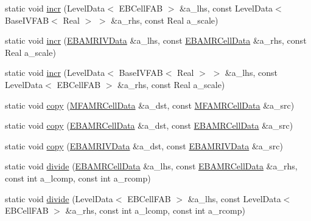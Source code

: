 \begin{DoxyCompactItemize}
\item 
static void \hyperlink{classdata__ops_a7a3971bfe83a19bdf8db45325689d9ed}{incr} (Level\+Data$<$ E\+B\+Cell\+F\+AB $>$ \&a\+\_\+lhs, const Level\+Data$<$ Base\+I\+V\+F\+AB$<$ Real $>$ $>$ \&a\+\_\+rhs, const Real a\+\_\+scale)
\item 
static void \hyperlink{classdata__ops_a39f83b14fdf5b6cca3ab01998da56427}{incr} (\hyperlink{type__definitions_8H_a6b8fa905d55cbb491b52180386f0e0c1}{E\+B\+A\+M\+R\+I\+V\+Data} \&a\+\_\+lhs, const \hyperlink{type__definitions_8H_a7e610f301989e5e07781c5e338bdb7c3}{E\+B\+A\+M\+R\+Cell\+Data} \&a\+\_\+rhs, const Real a\+\_\+scale)
\item 
static void \hyperlink{classdata__ops_a9f6edb3657a0a79442d60440335b27ea}{incr} (Level\+Data$<$ Base\+I\+V\+F\+AB$<$ Real $>$ $>$ \&a\+\_\+lhs, const Level\+Data$<$ E\+B\+Cell\+F\+AB $>$ \&a\+\_\+rhs, const Real a\+\_\+scale)
\item 
static void \hyperlink{classdata__ops_ab6c14992df412357c6fcf0ca4d45f4a4}{copy} (\hyperlink{type__definitions_8H_aced885351d40daa466564acbee4042d3}{M\+F\+A\+M\+R\+Cell\+Data} \&a\+\_\+dst, const \hyperlink{type__definitions_8H_aced885351d40daa466564acbee4042d3}{M\+F\+A\+M\+R\+Cell\+Data} \&a\+\_\+src)
\item 
static void \hyperlink{classdata__ops_ac98d12aaec2ed8ebd34b47b8e3734eb7}{copy} (\hyperlink{type__definitions_8H_a7e610f301989e5e07781c5e338bdb7c3}{E\+B\+A\+M\+R\+Cell\+Data} \&a\+\_\+dst, const \hyperlink{type__definitions_8H_a7e610f301989e5e07781c5e338bdb7c3}{E\+B\+A\+M\+R\+Cell\+Data} \&a\+\_\+src)
\item 
static void \hyperlink{classdata__ops_ada21e01b096cc11d7cbc417bb4f13092}{copy} (\hyperlink{type__definitions_8H_a6b8fa905d55cbb491b52180386f0e0c1}{E\+B\+A\+M\+R\+I\+V\+Data} \&a\+\_\+dst, const \hyperlink{type__definitions_8H_a6b8fa905d55cbb491b52180386f0e0c1}{E\+B\+A\+M\+R\+I\+V\+Data} \&a\+\_\+src)
\item 
static void \hyperlink{classdata__ops_a7f49f07cc9d589c729c70f7c272a88d9}{divide} (\hyperlink{type__definitions_8H_a7e610f301989e5e07781c5e338bdb7c3}{E\+B\+A\+M\+R\+Cell\+Data} \&a\+\_\+lhs, const \hyperlink{type__definitions_8H_a7e610f301989e5e07781c5e338bdb7c3}{E\+B\+A\+M\+R\+Cell\+Data} \&a\+\_\+rhs, const int a\+\_\+lcomp, const int a\+\_\+rcomp)
\item 
static void \hyperlink{classdata__ops_aee99d5fccaf4dd9cfdc105aaefcc77f4}{divide} (Level\+Data$<$ E\+B\+Cell\+F\+AB $>$ \&a\+\_\+lhs, const Level\+Data$<$ E\+B\+Cell\+F\+AB $>$ \&a\+\_\+rhs, const int a\+\_\+lcomp, const int a\+\_\+rcomp)

\end{DoxyCompactItemize}

